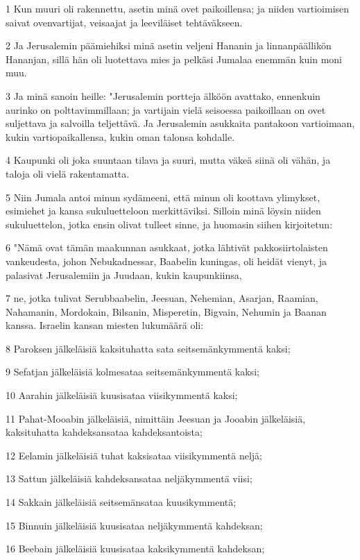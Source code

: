 \par 1 Kun muuri oli rakennettu, asetin minä ovet paikoillensa; ja niiden vartioimisen saivat ovenvartijat, veisaajat ja leeviläiset tehtäväkseen.
\par 2 Ja Jerusalemin päämiehiksi minä asetin veljeni Hananin ja linnanpäällikön Hananjan, sillä hän oli luotettava mies ja pelkäsi Jumalaa enemmän kuin moni muu.
\par 3 Ja minä sanoin heille: "Jerusalemin portteja älköön avattako, ennenkuin aurinko on polttavimmillaan; ja vartijain vielä seisoessa paikoillaan on ovet suljettava ja salvoilla teljettävä. Ja Jerusalemin asukkaita pantakoon vartioimaan, kukin vartiopaikallensa, kukin oman talonsa kohdalle.
\par 4 Kaupunki oli joka suuntaan tilava ja suuri, mutta väkeä siinä oli vähän, ja taloja oli vielä rakentamatta.
\par 5 Niin Jumala antoi minun sydämeeni, että minun oli koottava ylimykset, esimiehet ja kansa sukuluetteloon merkittäviksi. Silloin minä löysin niiden sukuluettelon, jotka ensin olivat tulleet sinne, ja huomasin siihen kirjoitetun:
\par 6 "Nämä ovat tämän maakunnan asukkaat, jotka lähtivät pakkosiirtolaisten vankeudesta, johon Nebukadnessar, Baabelin kuningas, oli heidät vienyt, ja palasivat Jerusalemiin ja Juudaan, kukin kaupunkiinsa,
\par 7 ne, jotka tulivat Serubbaabelin, Jeesuan, Nehemian, Asarjan, Raamian, Nahamanin, Mordokain, Bilsanin, Misperetin, Bigvain, Nehumin ja Baanan kanssa. Israelin kansan miesten lukumäärä oli:
\par 8 Paroksen jälkeläisiä kaksituhatta sata seitsemänkymmentä kaksi;
\par 9 Sefatjan jälkeläisiä kolmesataa seitsemänkymmentä kaksi;
\par 10 Aarahin jälkeläisiä kuusisataa viisikymmentä kaksi;
\par 11 Pahat-Mooabin jälkeläisiä, nimittäin Jeesuan ja Jooabin jälkeläisiä, kaksituhatta kahdeksansataa kahdeksantoista;
\par 12 Eelamin jälkeläisiä tuhat kaksisataa viisikymmentä neljä;
\par 13 Sattun jälkeläisiä kahdeksansataa neljäkymmentä viisi;
\par 14 Sakkain jälkeläisiä seitsemänsataa kuusikymmentä;
\par 15 Binnuin jälkeläisiä kuusisataa neljäkymmentä kahdeksan;
\par 16 Beebain jälkeläisiä kuusisataa kaksikymmentä kahdeksan;
